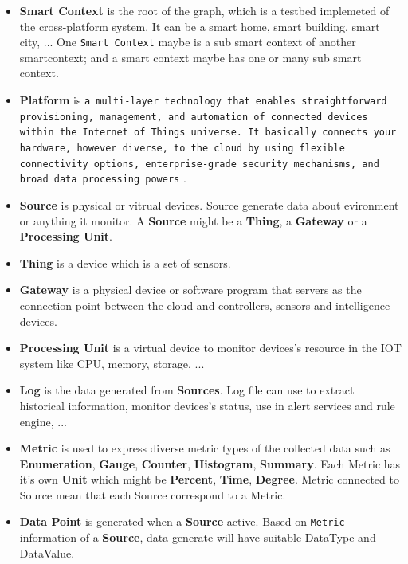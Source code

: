 \documentclass[runningheads,a4paper]{llncs}
\begin{document}
\begin{itemize}
\item \textbf{Smart Context} is the root of the graph, which is a testbed implemeted of the cross-platform system. It can be a smart home, smart building, smart city, ... One \texttt{Smart Context} maybe is a sub smart context of another smartcontext; and a smart context maybe has one or many sub smart context.

\item \textbf{Platform} is \texttt{a multi-layer technology that enables straightforward provisioning, management, and automation of connected devices within the Internet of Things universe. It basically connects your hardware, however diverse, to the cloud by using flexible connectivity options, enterprise-grade security mechanisms, and broad data processing powers} \cite{platform}. 

\item \textbf{Source} is physical or vitrual devices. Source generate data about evironment or anything it monitor. A \textbf{Source} might be a \textbf{Thing}, a \textbf{Gateway} or a \textbf{Processing Unit}.
 
\item \textbf{Thing} is a device which is a set of sensors. 

\item \textbf{Gateway} is a physical device or software program that servers as the connection point between the cloud and controllers, sensors and intelligence devices.

\item \textbf{Processing Unit} is a virtual device to monitor devices's resource in the IOT system like CPU, memory, storage, ... 

\item \textbf{Log} is the data generated from \textbf{Sources}. Log file can use to extract historical information, monitor devices's status, use in alert services and rule engine, ...

\item \textbf{Metric} is used to express diverse metric types of the collected data such as \textbf{Enumeration}, \textbf{Gauge}, \textbf{Counter}, \textbf{Histogram}, \textbf{Summary}. Each Metric has it's own \textbf{Unit} which might be \textbf{Percent}, \textbf{Time}, \textbf{Degree}. Metric connected to Source mean that each Source correspond to a Metric.

\item \textbf{Data Point} is generated when a \textbf{Source} active. Based on \texttt{Metric} information of a \textbf{Source}, data generate will have suitable DataType and DataValue.
\end{itemize}
\end{document}
